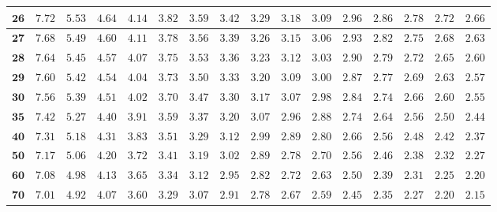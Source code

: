 \begin{customTableWrapper}{1.4}
\begin{longtable}{|r|r|r|r|r|r|r|r|r|r|r|r|r|r|r|r|}
    ${\mathbf{26}}$  & ${7.72}$   & ${5.53}$   & ${4.64}$   & ${4.14}$   & ${3.82}$   & ${3.59}$   & ${3.42}$   & ${3.29}$   & ${3.18}$   & ${3.09}$   & ${2.96}$   & ${2.86}$   & ${2.78}$   & ${2.72}$   & ${2.66}$   \\ \hline 
    ${\mathbf{27}}$  & ${7.68}$   & ${5.49}$   & ${4.60}$   & ${4.11}$   & ${3.78}$   & ${3.56}$   & ${3.39}$   & ${3.26}$   & ${3.15}$   & ${3.06}$   & ${2.93}$   & ${2.82}$   & ${2.75}$   & ${2.68}$   & ${2.63}$   \\ \hline 
    ${\mathbf{28}}$  & ${7.64}$   & ${5.45}$   & ${4.57}$   & ${4.07}$   & ${3.75}$   & ${3.53}$   & ${3.36}$   & ${3.23}$   & ${3.12}$   & ${3.03}$   & ${2.90}$   & ${2.79}$   & ${2.72}$   & ${2.65}$   & ${2.60}$   \\ \hline 
    ${\mathbf{29}}$  & ${7.60}$   & ${5.42}$   & ${4.54}$   & ${4.04}$   & ${3.73}$   & ${3.50}$   & ${3.33}$   & ${3.20}$   & ${3.09}$   & ${3.00}$   & ${2.87}$   & ${2.77}$   & ${2.69}$   & ${2.63}$   & ${2.57}$   \\ \hline 
    ${\mathbf{30}}$  & ${7.56}$   & ${5.39}$   & ${4.51}$   & ${4.02}$   & ${3.70}$   & ${3.47}$   & ${3.30}$   & ${3.17}$   & ${3.07}$   & ${2.98}$   & ${2.84}$   & ${2.74}$   & ${2.66}$   & ${2.60}$   & ${2.55}$   \\ \hline 
    ${\mathbf{35}}$  & ${7.42}$   & ${5.27}$   & ${4.40}$   & ${3.91}$   & ${3.59}$   & ${3.37}$   & ${3.20}$   & ${3.07}$   & ${2.96}$   & ${2.88}$   & ${2.74}$   & ${2.64}$   & ${2.56}$   & ${2.50}$   & ${2.44}$   \\ \hline 
    ${\mathbf{40}}$  & ${7.31}$   & ${5.18}$   & ${4.31}$   & ${3.83}$   & ${3.51}$   & ${3.29}$   & ${3.12}$   & ${2.99}$   & ${2.89}$   & ${2.80}$   & ${2.66}$   & ${2.56}$   & ${2.48}$   & ${2.42}$   & ${2.37}$   \\ \hline 
    ${\mathbf{50}}$  & ${7.17}$   & ${5.06}$   & ${4.20}$   & ${3.72}$   & ${3.41}$   & ${3.19}$   & ${3.02}$   & ${2.89}$   & ${2.78}$   & ${2.70}$   & ${2.56}$   & ${2.46}$   & ${2.38}$   & ${2.32}$   & ${2.27}$   \\ \hline 
    ${\mathbf{60}}$  & ${7.08}$   & ${4.98}$   & ${4.13}$   & ${3.65}$   & ${3.34}$   & ${3.12}$   & ${2.95}$   & ${2.82}$   & ${2.72}$   & ${2.63}$   & ${2.50}$   & ${2.39}$   & ${2.31}$   & ${2.25}$   & ${2.20}$   \\ \hline 
    ${\mathbf{70}}$  & ${7.01}$   & ${4.92}$   & ${4.07}$   & ${3.60}$   & ${3.29}$   & ${3.07}$   & ${2.91}$   & ${2.78}$   & ${2.67}$   & ${2.59}$   & ${2.45}$   & ${2.35}$   & ${2.27}$   & ${2.20}$   & ${2.15}$   \\ \hline 

\end{longtable}
\end{customTableWrapper}
